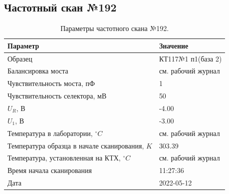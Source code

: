 \subsection{Частотный скан №192}
\begin{table}[!ht]
    \centering
    \caption{Параметры частотного скана №192.}
    \begin{tabular}{|l|l|}
        \hline
        Параметр                                       & Значение                  \\ \hline
        Образец                                        & КТ117№1 п1(база 2)        \\ \hline
        Балансировка моста                             & см. рабочий журнал        \\ \hline
        Чувствительность моста, пФ                     & 1                         \\ \hline
        Чувствительность селектора, мВ                 & 50                        \\ \hline
        $U_R$, В                                       & -4.00                     \\ \hline
        $U_1$, В                                       & -3.00                     \\ \hline
        Температура в лаборатории, $^\circ C$          & см. рабочий журнал        \\ \hline
        Температура образца в начале сканирования, $K$ & 303.39                    \\ \hline
        Температура, установленная на КТХ, $^\circ C$  & см. рабочий журнал        \\ \hline
        Время начала сканирования                      & 11:27:36                  \\ \hline
        Дата                                           & 2022-05-12                \\ \hline
    \end{tabular}
    \label{table:frequency_scan_192}
\end{table}

